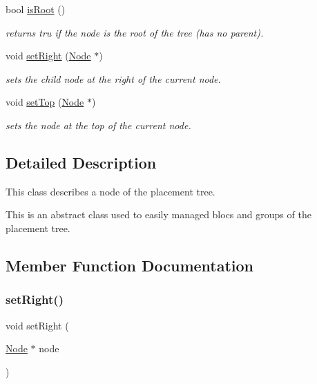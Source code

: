 \begin{DoxyCompactItemize}
\mbox{\label{class_open_chams_1_1_node_ad78e3dab6fc481769907b77419fe4bac}} 
bool \hyperlink{class_open_chams_1_1_node_ad78e3dab6fc481769907b77419fe4bac}{is\+Root} ()
\begin{DoxyCompactList}\small\item\em returns tru if the node is the root of the tree (has no parent). \end{DoxyCompactList}\item 
void \hyperlink{class_open_chams_1_1_node_a55d8fa1d2b1c961fcab18acbf67c8be1}{set\+Right} (\hyperlink{class_open_chams_1_1_node}{Node} $\ast$)
\begin{DoxyCompactList}\small\item\em sets the child node at the right of the current node. \end{DoxyCompactList}\item 
void \hyperlink{class_open_chams_1_1_node_a32e2fbbb73c6b7ee4a30189cc30106bf}{set\+Top} (\hyperlink{class_open_chams_1_1_node}{Node} $\ast$)
\begin{DoxyCompactList}\small\item\em sets the node at the top of the current node. \end{DoxyCompactList}\end{DoxyCompactItemize}


\subsection{Detailed Description}
This class describes a node of the placement tree.

This is an abstract class used to easily managed blocs and groups of the placement tree. 

\subsection{Member Function Documentation}
\mbox{\label{class_open_chams_1_1_node_a55d8fa1d2b1c961fcab18acbf67c8be1}} 
\subsubsection{\texorpdfstring{set\+Right()}{setRight()}}
{\footnotesize\ttfamily void set\+Right (\begin{DoxyParamCaption}\item[{\hyperlink{class_open_chams_1_1_node}{Node} $\ast$}]{node }\end{DoxyParamCaption})\hspace{0.3cm}{\ttfamily [inline]}}



